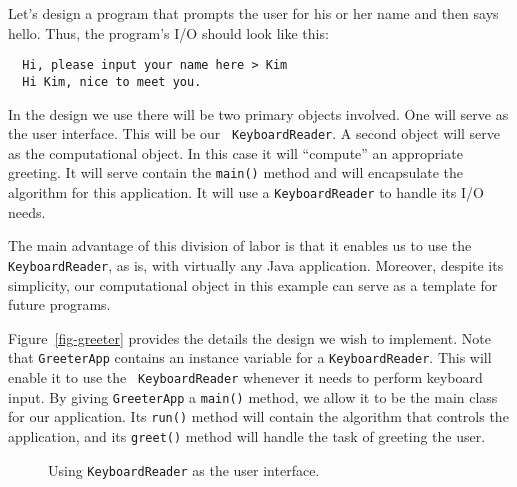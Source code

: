 Let's design a program that prompts the user for his or her name and
then says hello. Thus, the program's I/O should look like this:

\begin{jjjlisting}
\begin{lstlisting}
  Hi, please input your name here > Kim
  Hi Kim, nice to meet you.
\end{lstlisting}
\end{jjjlisting}

In the design we use there will be two primary objects involved. One
will serve as the user interface. This will be our {\tt
KeyboardReader}. A second object will serve as the computational
object.  In this case it will ``compute'' an appropriate greeting.  It
will serve contain the {\tt main()} method and will encapsulate the
algorithm for this application. It will use a {\tt KeyboardReader} to
handle its I/O needs.

The main advantage of this division of labor is that it enables us to
use the {\tt KeyboardReader}, as is, with virtually any Java
application. Moreover, despite its simplicity,  our computational
object in this example can serve as a template for future 
programs.



 
Figure~\ref{fig-greeter} provides the details the design we wish to
implement. Note that {\tt GreeterApp} contains an instance variable
for a {\tt KeyboardReader}.  This will enable it to use the {\tt
KeyboardReader} whenever it needs to perform keyboard input. By giving
{\tt GreeterApp} a {\tt main()} method, we allow it to be the main
class for our application.  Its {\tt run()} method will contain the
algorithm that controls the application, and its {\tt greet()} method
will handle the task of greeting the user.

\begin{figure}[h]
{Using {\tt Key\-board\-Read\-er} as the user interface.
\label{fig-greeter}
\label{pg-fig-greeter}}
\end{figure}

